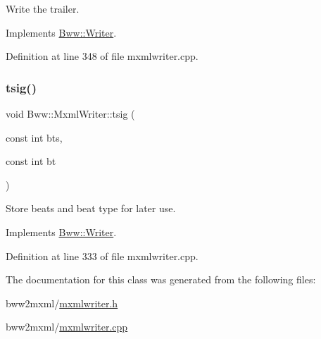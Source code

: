 Write the trailer. 

Implements \hyperlink{class_bww_1_1_writer}{Bww\+::\+Writer}.



Definition at line 348 of file mxmlwriter.\+cpp.

\mbox{\label{class_bww_1_1_mxml_writer_a69142df07a037feead38ce59b19e89f4}} 
\subsubsection{\texorpdfstring{tsig()}{tsig()}}
{\footnotesize\ttfamily void Bww\+::\+Mxml\+Writer\+::tsig (\begin{DoxyParamCaption}\item[{const int}]{bts,  }\item[{const int}]{bt }\end{DoxyParamCaption})\hspace{0.3cm}{\ttfamily [virtual]}}

Store beats and beat type for later use. 

Implements \hyperlink{class_bww_1_1_writer}{Bww\+::\+Writer}.



Definition at line 333 of file mxmlwriter.\+cpp.



The documentation for this class was generated from the following files\+:\begin{DoxyCompactItemize}
\item 
bww2mxml/\hyperlink{mxmlwriter_8h}{mxmlwriter.\+h}\item 
bww2mxml/\hyperlink{mxmlwriter_8cpp}{mxmlwriter.\+cpp}\end{DoxyCompactItemize}
